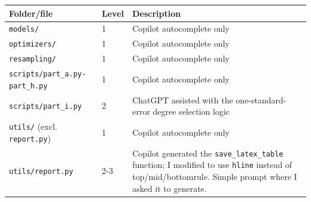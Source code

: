 \documentclass[amssymb,twocolumn,aps]{revtex4}
\begin{document}
\begin{tabular}{llp{7cm}}
    Folder/file                                & Level & Description                                                                                                                                                                                                                          \\ \hline
    \texttt{models/}                           & 1     & Copilot autocomplete only                                                                                                                                                                                                            \\
    \texttt{optimizers/}                       & 1     & Copilot autocomplete only                                                                                                                                                                                                            \\
    \texttt{resampling/}                       & 1     & Copilot autocomplete only                                                                                                                                                                                                            \\
    \texttt{scripts/part\_a.py-part\_h.py}     & 1     & Copilot autocomplete only                                                                                                                                                                                                            \\
    \texttt{scripts/part\_i.py}                & 2     & ChatGPT assisted with the one-standard-error degree selection logic                                                                                                                                                                  \\
    \texttt{utils/} (excl. \texttt{report.py}) & 1     & Copilot autocomplete only                                                                                                                                                                                                            \\
    \texttt{utils/report.py}                   & 2-3   & Copilot generated the \texttt{save\_latex\_table} function; I modified to use \texttt{hline} instead of top/mid/bottomrule. Simple prompt where I asked it to generate.                                                              \\

\end{tabular}
\end{document}
